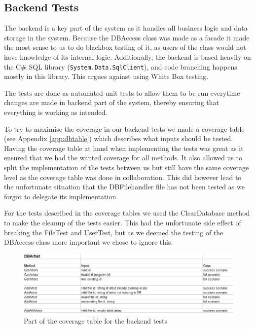 \subsection{Backend Tests}
The backend is a key part of the system as it handles all business logic and data storage in the system. Because 
the DBAccess class was made as a facade it made the most sense to us to do blackbox testing of it, as users of
the class would not have knowledge of its internal logic. Additionally, the backend is based heavily on the C\#
SQL library (\verb+System.Data.SqlClient+), and code branching happens mostly in this library. This argues against
using White Box testing.

The tests are done as automated unit tests to allow them
to be run everytime changes are made in backend part of the system, thereby ensuring that everything is working as
intended.

To try to maximise the coverage in our backend tests we made a coverage table
(see Appendix \ref{app:dbtable}) which describes what inputs should be tested.
Having the coverage table at hand when implementing the tests was great as it
ensured that we had the wanted coverage for all methods. It also allowed us to
split the implementation of the tests between us but still have the same
coverage level as the coverage table was done in collaboration. This did 
however lead to the unfortunate situation that the DBFilehandler file has not
been tested as we forgot to delegate its implementation.

For the tests described in the coverage tables we used the ClearDatabase method
to make the cleanup of the tests easier. This had the unfortunate side effect of
breaking the FileTest and UserTest, but as we deemed the testing of the DBAccess
class more important we chose to ignore this. 
\begin{figure}[hbt]
	\centering
	\includegraphics[scale=0.52]{./testing/coverage.jpg}
	\caption{Part of the coverage table for the backend tests}
	\label{fig:covtabs}
\end{figure}
